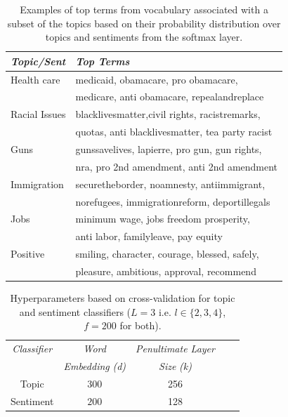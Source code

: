 \documentclass[letterpaper]{article}
\begin{document}
\begin{table}[h]
\centering
\small

\begin{tabular}{|l|l|}
\hline %
\emph{Topic/Sent} & \emph{Top Terms} \\ \hline 
Health care & medicaid, obamacare, pro obamacare, \\ & medicare, anti obamacare, repealandreplace \\\hline
Racial Issues & blacklivesmatter,civil rights, racistremarks,\\&  quotas, anti blacklivesmatter, tea party racist \\\hline
Guns & gunssavelives, lapierre, pro gun, gun rights, \\ & nra, pro 2nd amendment, anti 2nd amendment \\\hline
Immigration & securetheborder, noamnesty, antiimmigrant, \\& norefugees, immigrationreform, deportillegals \\\hline
Jobs & minimum wage, jobs freedom prosperity, \\ & anti labor, familyleave, pay equity \\\hline
Positive & smiling, character, courage, blessed, safely,\\ & pleasure, ambitious, approval, recommend \\\hline


\end{tabular}
\caption{Examples of top terms from vocabulary associated with a subset of the topics based on their probability distribution over topics and sentiments from the softmax layer.}
\label{qe} %
\end{table}



\begin{table}[]%
\centering
\small
\begin{tabular}{ |c|c|c|c|c| }
\hline %
\emph{Classifier} & \emph{Word}    & \emph{Penultimate Layer} \\
&   \emph{Embedding} \emph{(d)} & \emph{Size} \emph{(k)} \\\hline %
Topic & $300$ &  256  \\\hline
Sentiment &$200$ &  128 \\\hline

\end{tabular}
\caption{Hyperparameters based on cross-validation for topic and sentiment classifiers ($L=3$ i.e. $l\in \{2,3,4\}$, $f=200$ for both). }
\label{topic_sent} %
\end{table}
\end{document}
